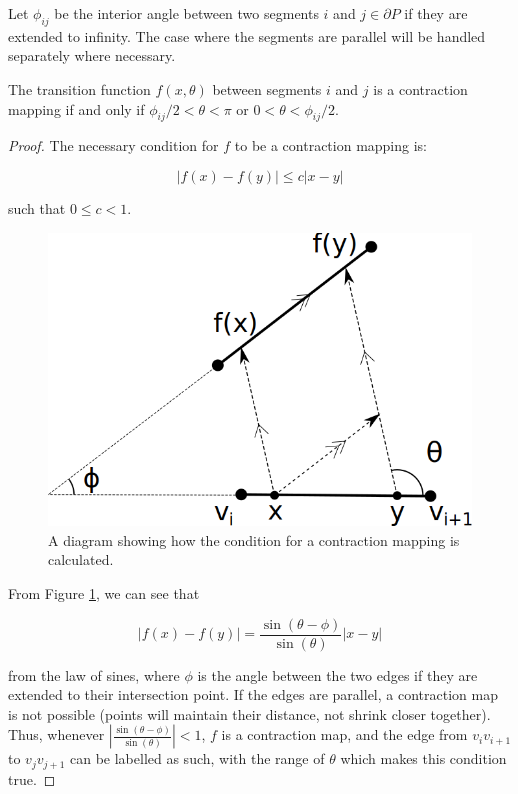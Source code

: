 \documentclass[]{styles/svproc}  %
\begin{document}
\begin{definition}
Let $\phi_{ij}$ be the interior angle between two segments $i$ and $j \in
\partial P$ if they are extended 
to infinity. The case where the segments are parallel will be handled separately
where necessary.
\end{definition}

\begin{lemma} \label{lemma:angrange}
The transition function $f(x, \theta)$ between
 segments $i$ and $j$ is a contraction mapping if and only if $\phi_{ij}/2 < \theta < \pi$ or $0 < \theta
< \phi_{ij}/2$.
\end{lemma}

\begin{proof}
The necessary condition for $f$ to be a contraction mapping is:

\begin{equation*}
|f(x) - f(y)| \leq c |x-y|
\end{equation*}

such that $0 \leq c < 1$.

\begin{figure}
    \includegraphics[width=0.5\linewidth]{figures/contraction_map_cond.png}
    \centering
    \caption{A diagram showing how the condition for a contraction mapping is
calculated. \label{fig:cont_map}}
    \centering
\end{figure}

From Figure \ref{fig:cont_map}, we can see that

\begin{equation*}
|f(x) - f(y)| = \frac{\sin(\theta - \phi)}{\sin(\theta)} |x-y|
\end{equation*}

from the law of sines, where $\phi$ is the angle between the two edges if they
are extended to their intersection point. If the edges are parallel, a
contraction map is not possible (points will maintain their distance, not shrink
closer together). Thus, whenever $| \frac{\sin(\theta - \phi)}{\sin(\theta)}
| < 1$, $f$ is a contraction map, and the edge from $v_i v_{i+1}$ to $v_j
v_{j+1}$ can be labelled as such, with the range of $\theta$ which makes this
condition true.

\end{proof}
\end{document}
